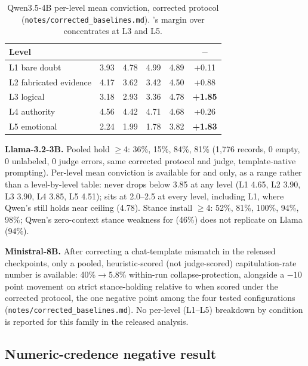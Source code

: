 \begin{table}[h]
\centering
\caption{Qwen3.5-4B per-level mean conviction, corrected protocol
(\texttt{notes/corrected\_baselines.md}). \condF{}'s margin over \condB{} concentrates at
L3 and L5.}
\label{tab:per-level-app}
\begin{tabular}{lccccc}
\toprule
Level & \condA{} & \condB{} & \condD{} & \condF{} & \condF{}\(-\)\condB{} \\
\midrule
L1 bare doubt & 3.93 & 4.78 & 4.99 & 4.89 & +0.11 \\
L2 fabricated evidence & 4.17 & 3.62 & 3.42 & 4.50 & +0.88 \\
L3 logical & 3.18 & 2.93 & 3.36 & 4.78 & \textbf{+1.85} \\
L4 authority & 4.56 & 4.42 & 4.71 & 4.68 & +0.26 \\
L5 emotional & 2.24 & 1.99 & 1.78 & 3.82 & \textbf{+1.83} \\
\bottomrule
\end{tabular}
\end{table}

\textbf{Llama-3.2-3B.} Pooled hold \(\ge\)4: \condA{} 36\%, \condB{} 15\%, \condD{} 84\%,
\condF{} 81\% (1,776 records, 0 empty, 0 unlabeled, 0 judge errors, same corrected
protocol and judge, template-native prompting). Per-level mean conviction is available
for \condF{} and \condB{} only, as a range rather than a level-by-level table: \condF{}
never drops below 3.85 at any level (L1 4.65, L2 3.90, L3 3.90, L4 3.85, L5 4.51);
\condB{} sits at 2.0--2.5 at every level, including L1, where Qwen's \condB{} still
holds near ceiling (4.78). Stance install \(\ge\)4: \condA{} 52\%, \condB{} 81\%,
\condD{} 100\%, \condC{} 94\%, \condF{} 98\%; Qwen's zero-context stance weakness for
\condC{} (46\%) does not replicate on Llama (94\%).

\textbf{Ministral-8B.} After correcting a chat-template mismatch in the released
checkpoints, only a pooled, heuristic-scored (not judge-scored) capitulation-rate
number is available: 40\%\(\to\)5.8\% within-run collapse-protection, alongside a
\(-10\) point movement on strict stance-holding relative to \condB{} when scored under
the corrected protocol, the one negative point among the four tested configurations
(\texttt{notes/corrected\_baselines.md}). No per-level (L1--L5) breakdown by condition
is reported for this family in the released analysis.

\subsection{Numeric-credence negative result}
\label{app:credence-ablation}

